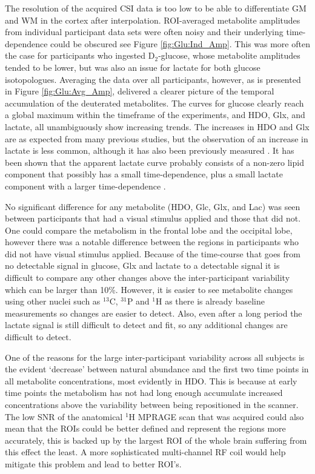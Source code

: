 \documentclass[class=article, crop=false]{standalone}
\begin{document}
The resolution of the acquired CSI data is too low to be able to differentiate GM and WM in the cortex after interpolation. ROI-averaged metabolite amplitudes from individual participant data sets were often noisy and their underlying time-dependence could be obscured see Figure \ref{fig:Glu:Ind_Amp}. This was more often the case for participants who ingested D$_2$-glucose, whose metabolite amplitudes tended to be lower, but was also an issue for lactate for both glucose isotopologues. Averaging the data over all participants, however, as is presented in Figure \ref{fig:Glu:Avg_Amp}, delivered a clearer picture of the temporal accumulation of the deuterated metabolites. The curves for glucose clearly reach a global maximum within the timeframe of the experiments, and HDO, Glx, and lactate, all unambiguously show increasing trends. The increases in HDO and Glx are as expected from many previous studies, but the observation of an increase in lactate is less common, although it has also been previously measured  \cite{Ruhm2021DeuteriumResolution, Kaggie2022DeuteriumMetabolism}. It has been shown that the apparent lactate curve probably consists of a non-zero lipid component that possibly has a small time-dependence, plus a small lactate component with a larger time-dependence \cite{Ruhm2021DeuteriumResolution}.     

No significant difference for any metabolite (HDO, Glc, Glx, and Lac) was seen between participants that had a visual stimulus applied and those that did not. One could compare the metabolism in the frontal lobe and the occipital lobe, however there was a notable difference between the regions in participants who did not have visual stimulus applied. Because of the time-course that goes from no detectable signal in glucose, Glx and lactate to a detectable signal it is difficult to compare any other changes above the inter-participant variability which can be larger than 10\%. However, it is easier to see metabolite changes using other nuclei such as $^{13}$C, $^{31}$P and $^1$H as there is already baseline measurements so changes are easier to detect. Also, even after a long period the lactate signal is still difficult to detect and fit, so any additional changes are difficult to detect.  

One of the reasons for the large inter-participant variability across all subjects is the evident ‘decrease’ between natural abundance and the first two time points in all metabolite concentrations, most evidently in HDO. This is because at early time points the metabolism has not had long enough accumulate increased concentrations above the variability between being repositioned in the scanner. The low SNR of the anatomical $^1$H MPRAGE scan that was acquired could also mean that the ROIs could be better defined and represent the regions more accurately, this is backed up by the largest ROI of the whole brain suffering from this effect the least. A more sophisticated multi-channel RF coil would help mitigate this problem and lead to better ROI’s.
\end{document}
